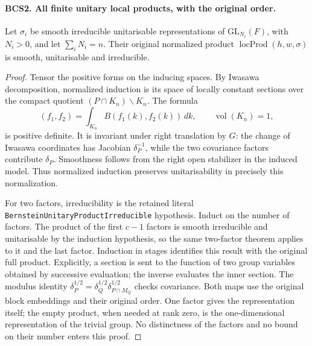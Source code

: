 \paragraph{BCS2. All finite unitary local products, with the original order.}
\label{claim:BCS2}
Let \(\sigma_i\) be smooth irreducible unitarisable representations
of \(\mathrm{GL}_{N_i}(F)\), with \(N_i>0\), and let
\(\sum_iN_i=n\).  Their original normalized product
\(\operatorname{locProd}(h,w,\sigma)\) is smooth, unitarisable and
irreducible.
\begin{proof}
Tensor the positive forms on the inducing spaces.  By Iwasawa
decomposition, normalized induction is its space of locally constant
sections over the compact quotient \((P\cap K_n)\backslash K_n\).
The formula
\[
             (f_1,f_2)=\int_{K_n}B(f_1(k),f_2(k))\,dk,
             \qquad\operatorname{vol}(K_n)=1,
 \tag{BCS.5}
\]
is positive definite.  It is invariant under right translation by
\(G\): the change of Iwasawa coordinates has Jacobian
\(\delta_P^{-1}\), while the two covariance factors contribute
\(\delta_P\).  Smoothness follows from the right open stabilizer
in the induced model.  Thus normalized induction preserves
unitarisability in precisely this normalization.

For two factors, irreducibility is the retained literal
\texttt{BernsteinUnitaryProductIrreducible} hypothesis.  Induct on
the number of factors.  The product of the first \(c-1\) factors
is smooth irreducible and unitarisable by the induction hypothesis,
so the same two-factor theorem applies to it and the last factor.
Induction in stages identifies this result with the original full
product.  Explicitly, a section is sent to the function of two group
variables obtained by successive evaluation; the inverse evaluates
the inner section.  The modulus identity
\(\delta_P^{1/2}=\delta_Q^{1/2}\delta_{P\cap M_Q}^{1/2}\)
checks covariance.  Both maps use the original block embeddings and
their original order.  One factor gives the representation itself;
the empty product, when needed at rank zero, is the one-dimensional
representation of the trivial group.  No distinctness of the factors
and no bound on their number enters this proof.
\end{proof}

